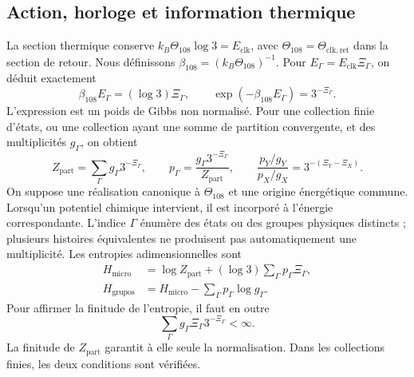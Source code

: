 \subsection{Action, horloge et information thermique}
\label{md:hib:termica}

La section thermique conserve
$k_B\Theta_{108}\log3=E_{\mathrm{clk}}$, avec
$\Theta_{108}=\Theta_{\mathrm{clk,ret}}$ dans la section de retour.
Nous définissons
$\beta_{108}=(k_B\Theta_{108})^{-1}$. Pour
$E_\Gamma=E_{\mathrm{clk}}\Xi_\Gamma$, on déduit exactement
\begin{equation}
 \beta_{108}E_\Gamma=(\log3)\Xi_\Gamma,
 \qquad
 \boxed{\exp(-\beta_{108}E_\Gamma)=3^{-\Xi_\Gamma}.}
 \label{md:hib:peso-termico}
\end{equation}
L’expression est un poids de Gibbs non normalisé. Pour une collection finie
d’états, ou une collection ayant une somme de partition convergente, et des
multiplicités $g_\Gamma$, on obtient
\begin{equation}
 Z_{\mathrm{part}}=\sum_\Gamma g_\Gamma3^{-\Xi_\Gamma},\qquad
 p_\Gamma=\frac{g_\Gamma3^{-\Xi_\Gamma}}{Z_{\mathrm{part}}},\qquad
 \frac{p_Y/g_Y}{p_X/g_X}=3^{-(\Xi_Y-\Xi_X)}.
 \label{md:hib:particion}
\end{equation}
On suppose une réalisation canonique à $\Theta_{108}$ et une origine énergétique
commune. Lorsqu’un potentiel chimique intervient, il est incorporé à l’énergie
correspondante. L’indice $\Gamma$ énumère des états ou des groupes physiques
distincts ; plusieurs histoires équivalentes ne produisent pas automatiquement une
multiplicité. Les entropies adimensionnelles sont
\begin{equation}
 \begin{aligned}
 H_{\mathrm{micro}}
 &=\log Z_{\mathrm{part}}+(\log3)\sum_\Gamma p_\Gamma\Xi_\Gamma,\\
 H_{\mathrm{grupos}}
 &=H_{\mathrm{micro}}-\sum_\Gamma p_\Gamma\log g_\Gamma.
 \end{aligned}
 \label{md:hib:entropias}
\end{equation}
Pour affirmer la finitude de l’entropie, il faut en outre
\begin{equation}
 \sum_\Gamma g_\Gamma\Xi_\Gamma3^{-\Xi_\Gamma}<\infty.
 \label{md:hib:condicion-entropia}
\end{equation}
La finitude de $Z_{\mathrm{part}}$ garantit à elle seule la normalisation.
Dans les collections finies, les deux conditions sont vérifiées.

